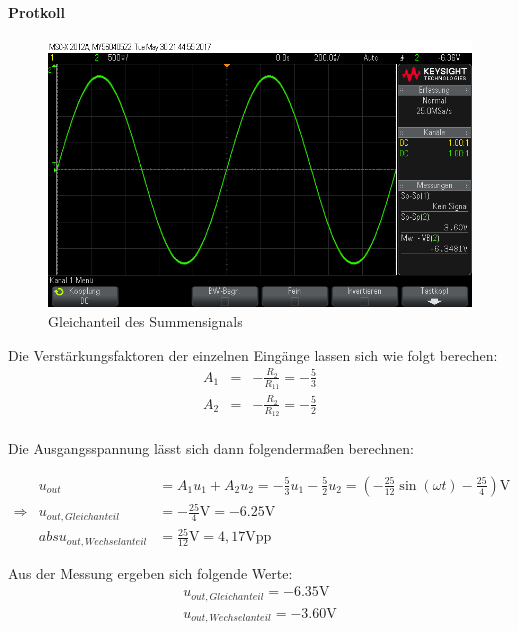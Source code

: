 \documentclass[10pt]{scrreprt}
\begin{document}
    \paragraph{Protkoll}
    \begin{center}
        \begin{figure}[H]
            \includegraphics[width=\textwidth]{scope_6.png}
            \caption{Gleichanteil des Summensignals}
        \end{figure}
    \end{center}

    Die Verstärkungsfaktoren der einzelnen Eingänge lassen sich wie folgt berechen:
    \begin{eqnarray*}
        A_1 &=& -\frac{R_2}{R_{11}} = -\frac{5}{3}\\
        A_2 &=& -\frac{R_2}{R_{12}} = -\frac{5}{2}\\
    \end{eqnarray*}

    Die Ausgangsspannung lässt sich dann folgendermaßen berechnen:

    \begin{eqnarray*}
        &u_{out}& = A_1 u_1 + A_2 u_2 = -\frac{5}{3} u_1 -\frac{5}{2} u_2 =
        (-\frac{25}{12}\sin(\omega t) - \frac{25}{4})\si{\volt}\\
        \Rightarrow &u_{out,Gleichanteil}& = -\frac{25}{4}\si{\volt} = -6.25\si{\volt}\\
        &abs{u_{out,Wechselanteil}}& = \frac{25}{12}\si{\volt} = 4,17 \si{\volt}\text{pp}
    \end{eqnarray*}

    Aus der Messung ergeben sich folgende Werte:
    \begin{eqnarray*}
        u_{out,Gleichanteil} = -6.35\si{\volt}\\
        u_{out,Wechselanteil} = -3.60\si{\volt}
    \end{eqnarray*}
\end{document}

